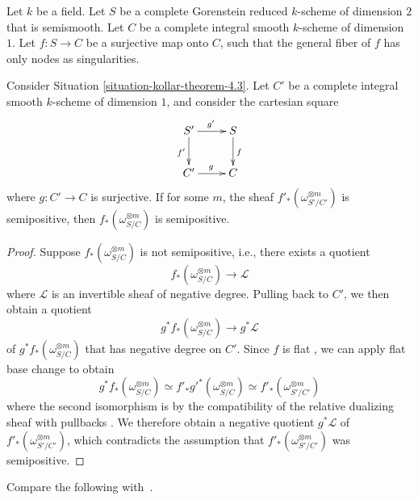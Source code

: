 \begin{situation}
\label{situation-kollar-theorem-4.3}
Let $k$ be a field.
Let $S$ be a complete Gorenstein reduced $k$-scheme of dimension $2$ that is
semismooth.
Let $C$ be a complete integral smooth $k$-scheme of dimension $1$.
Let $f : S \to C$ be a surjective map onto $C$, such that the general fiber of
$f$ has only nodes as singularities.
\end{situation}

\begin{lemma}
\label{lemma-base-change-okay}
Consider Situation \ref{situation-kollar-theorem-4.3}.
Let $C'$ be a complete integral smooth $k$-scheme of dimension $1$, and
consider the cartesian square
$$
\xymatrix{
S' \ar[d]_{f'}\ar[r]^{g'} & S\ar[d]^f\\
C' \ar[r]^g & C
}
$$
where $g: C' \to C$ is surjective.
If for some $m$, the sheaf $f'_*(\omega_{S'/C'}^{\otimes m})$ is semipositive,
then $f_*(\omega_{S/C}^{\otimes m})$ is semipositive.
\end{lemma}
\begin{proof}
Suppose $f_*(\omega_{S/C}^{\otimes m})$ is not semipositive, i.e., there
exists a quotient
$$f_*(\omega_{S/C}^{\otimes m}) \longrightarrow \mathcal{L}$$
where $\mathcal{L}$ is an invertible sheaf of negative degree.
Pulling back to $C'$, we then obtain a quotient
$$g^*f_*(\omega_{S/C}^{\otimes m}) \longrightarrow g^*\mathcal{L}$$
of $g^*f_*(\omega_{S/C}^{\otimes m})$ that has negative degree on $C'$.
Since $f$ is flat \cite[\href{http://stacks.math.columbia.edu/tag/00R4}{Tag
00R4}]{stacks-project}, we can apply flat base change
\cite[\href{http://stacks.math.columbia.edu/tag/02KH}{Tag 02KH}]{stacks-project}
to obtain
$$
g^*f_*(\omega_{S/C}^{\otimes m})
\simeq f'_*g'^*(\omega_{S/C}^{\otimes m})
\simeq f'_*(\omega_{S'/C'}^{\otimes m})
$$
where the second isomorphism is
by the compatibility of the relative dualizing sheaf with pullbacks
\cite[\href{http://stacks.math.columbia.edu/tag/0E4P}{Tag
0E4P}]{stacks-project}.
We therefore obtain a negative quotient $g^*\mathcal{L}$ of
$f'_*(\omega_{S'/C'}^{\otimes m})$, which contradicts the assumption that
$f'_*(\omega_{S'/C'}^{\otimes m})$ was semipositive.
\end{proof}

Compare the following with~\cite[Theorem 4.3]{ko90}.

